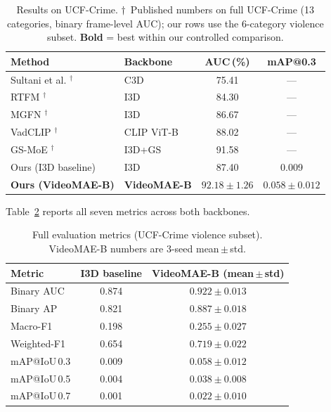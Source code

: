 \documentclass[11pt]{article}
\begin{document}
\begin{table}[t]
  \centering
  \caption{Results on UCF-Crime.
           $\dagger$~Published numbers on full UCF-Crime (13 categories,
           binary frame-level AUC); our rows use the 6-category violence
           subset. \textbf{Bold} = best within our controlled comparison.}
  \label{tab:main}
  \small
  \begin{tabular}{l l c c}
    \toprule
    \textbf{Method} & \textbf{Backbone} & \textbf{AUC\,(\%)} & \textbf{mAP@0.3} \\
    \midrule
    Sultani et al. \citeyearpar{sultani2018real}$^\dagger$  & C3D        & 75.41 & ---  \\
    RTFM \citeyearpar{tian2021weakly}$^\dagger$             & I3D        & 84.30 & ---  \\
    MGFN \citeyearpar{chen2023mgfn}$^\dagger$               & I3D        & 86.67 & ---  \\
    VadCLIP \citeyearpar{wu2024vadclip}$^\dagger$           & CLIP ViT-B & 88.02 & ---  \\
    GS-MoE \citeyearpar{wang2025gsmoe}$^\dagger$            & I3D+GS     & 91.58 & ---  \\
    \midrule
    Ours (I3D baseline)         & I3D          & 87.40                     & 0.009 \\
    \textbf{Ours (VideoMAE-B)}  & \textbf{VideoMAE-B} & $\mathbf{92.18 \pm 1.26}$ & $\mathbf{0.058 \pm 0.012}$ \\
    \bottomrule
  \end{tabular}
\end{table}

Table~\ref{tab:full} reports all seven metrics across both backbones.

\begin{table}[t]
  \centering
  \caption{Full evaluation metrics (UCF-Crime violence subset).
           VideoMAE-B numbers are 3-seed mean\,$\pm$\,std.}
  \label{tab:full}
  \small
  \begin{tabular}{l c c}
    \toprule
    \textbf{Metric}
      & \textbf{I3D baseline}
      & \textbf{VideoMAE-B (mean\,$\pm$\,std)} \\
    \midrule
    Binary AUC    & 0.874 & $0.922 \pm 0.013$ \\
    Binary AP     & 0.821 & $0.887 \pm 0.018$ \\
    Macro-F1      & 0.198 & $0.255 \pm 0.027$ \\
    Weighted-F1   & 0.654 & $0.719 \pm 0.022$ \\
    mAP@IoU\,0.3  & 0.009 & $0.058 \pm 0.012$ \\
    mAP@IoU\,0.5  & 0.004 & $0.038 \pm 0.008$ \\
    mAP@IoU\,0.7  & 0.001 & $0.022 \pm 0.010$ \\
    \bottomrule
  \end{tabular}
\end{table}
\end{document}
